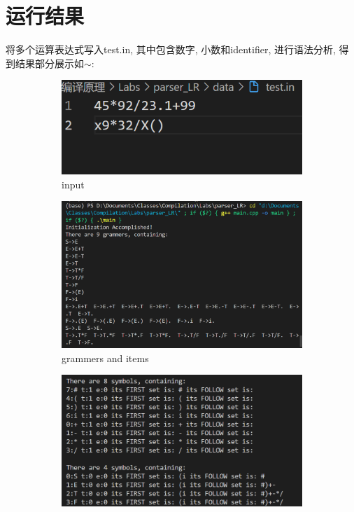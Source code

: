 \documentclass{zpt}
\begin{document}
    \section{运行结果}
    将多个运算表达式写入test.in, 其中包含数字, 小数和identifier, 进行语法分析, 得到结果部分展示如$\sim$:
    \begin{figure}
        \centering
        \begin{subfigure}[t]{0.45\textwidth}
            \includegraphics[width=\textwidth]{../resources/input.png}
            \caption{input}
            \label{fig::input}
        \end{subfigure}
        \begin{subfigure}[t]{0.45\textwidth}
            \includegraphics[width=\textwidth]{../resources/grammers.png}
            \caption{grammers and items}
            \label{fig::grammer}
        \end{subfigure}
        \begin{subfigure}[t]{0.45\textwidth}
            \includegraphics[width=\textwidth]{../resources/symbols.png}

\end{subfigure}
\end{figure}
\end{document}
